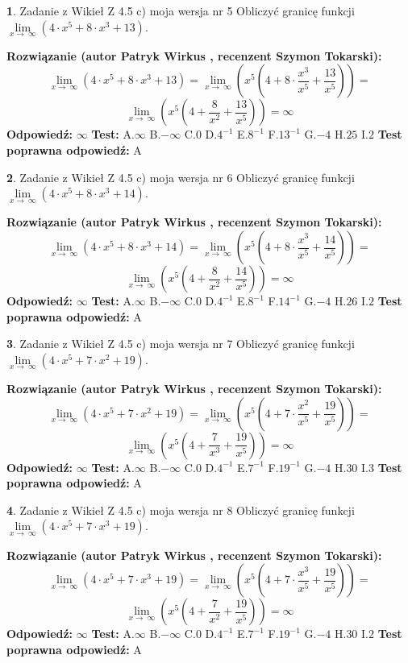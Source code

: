 \documentclass[12pt, a4paper]{article}
\theoremstyle{definition} %
\newtheorem{zad}{}
\newcommand{\zadStart}[1]{\begin{zad}#1\newline}
\newcommand{\zadStop}{\end{zad}}
\newcommand{\rozwStart}[2]{\noindent \textbf{Rozwiązanie (autor #1 , recenzent #2): }\newline}
\newcommand{\rozwStop}{\newline}
\newcommand{\odpStart}{\noindent \textbf{Odpowiedź:}\newline}
\newcommand{\odpStop}{\newline}
\newcommand{\testStart}{\noindent \textbf{Test:}\newline}
\newcommand{\testStop}{\newline}
\newcommand{\kluczStart}{\noindent \textbf{Test poprawna odpowiedź:}\newline}
\newcommand{\kluczStop}{\newline}
\begin{document}
\zadStart{Zadanie z Wikieł Z 4.5 c) moja wersja nr 5}
Obliczyć granicę funkcji  $\lim\limits_{x\to\ \infty}(4 \cdot x^{5}+8 \cdot x^{3}+13)$.
\zadStop
\rozwStart{Patryk Wirkus}{Szymon Tokarski}
$$\lim\limits_{x\to\ \infty}(4 \cdot x^{5}+8 \cdot x^{3}+13) = \lim\limits_{x\to\ \infty}(x^{5}(4 +8 \cdot \frac{x^{3}}{x^{5}}+\frac{13}{x^{5}})) =$$ $$\lim\limits_{x\to\ \infty}(x^{5}(4 +\frac{8}{x^{2}}+\frac{13}{x^{5}})) =\infty$$
\rozwStop
\odpStart
$\infty$
\odpStop
\testStart
A.$\infty$ B.$-\infty$ C.$0$ D.$4^{-1}$ E.$8^{-1}$
F.$13^{-1}$ G.$-4$
H.$25$
I.$2$
\testStop
\kluczStart
A
\kluczStop



\zadStart{Zadanie z Wikieł Z 4.5 c) moja wersja nr 6}
Obliczyć granicę funkcji  $\lim\limits_{x\to\ \infty}(4 \cdot x^{5}+8 \cdot x^{3}+14)$.
\zadStop
\rozwStart{Patryk Wirkus}{Szymon Tokarski}
$$\lim\limits_{x\to\ \infty}(4 \cdot x^{5}+8 \cdot x^{3}+14) = \lim\limits_{x\to\ \infty}(x^{5}(4 +8 \cdot \frac{x^{3}}{x^{5}}+\frac{14}{x^{5}})) =$$ $$\lim\limits_{x\to\ \infty}(x^{5}(4 +\frac{8}{x^{2}}+\frac{14}{x^{5}})) =\infty$$
\rozwStop
\odpStart
$\infty$
\odpStop
\testStart
A.$\infty$ B.$-\infty$ C.$0$ D.$4^{-1}$ E.$8^{-1}$
F.$14^{-1}$ G.$-4$
H.$26$
I.$2$
\testStop
\kluczStart
A
\kluczStop



\zadStart{Zadanie z Wikieł Z 4.5 c) moja wersja nr 7}
Obliczyć granicę funkcji  $\lim\limits_{x\to\ \infty}(4 \cdot x^{5}+7 \cdot x^{2}+19)$.
\zadStop
\rozwStart{Patryk Wirkus}{Szymon Tokarski}
$$\lim\limits_{x\to\ \infty}(4 \cdot x^{5}+7 \cdot x^{2}+19) = \lim\limits_{x\to\ \infty}(x^{5}(4 +7 \cdot \frac{x^{2}}{x^{5}}+\frac{19}{x^{5}})) =$$ $$\lim\limits_{x\to\ \infty}(x^{5}(4 +\frac{7}{x^{3}}+\frac{19}{x^{5}})) =\infty$$
\rozwStop
\odpStart
$\infty$
\odpStop
\testStart
A.$\infty$ B.$-\infty$ C.$0$ D.$4^{-1}$ E.$7^{-1}$
F.$19^{-1}$ G.$-4$
H.$30$
I.$3$
\testStop
\kluczStart
A
\kluczStop



\zadStart{Zadanie z Wikieł Z 4.5 c) moja wersja nr 8}
Obliczyć granicę funkcji  $\lim\limits_{x\to\ \infty}(4 \cdot x^{5}+7 \cdot x^{3}+19)$.
\zadStop
\rozwStart{Patryk Wirkus}{Szymon Tokarski}
$$\lim\limits_{x\to\ \infty}(4 \cdot x^{5}+7 \cdot x^{3}+19) = \lim\limits_{x\to\ \infty}(x^{5}(4 +7 \cdot \frac{x^{3}}{x^{5}}+\frac{19}{x^{5}})) =$$ $$\lim\limits_{x\to\ \infty}(x^{5}(4 +\frac{7}{x^{2}}+\frac{19}{x^{5}})) =\infty$$
\rozwStop
\odpStart
$\infty$
\odpStop
\testStart
A.$\infty$ B.$-\infty$ C.$0$ D.$4^{-1}$ E.$7^{-1}$
F.$19^{-1}$ G.$-4$
H.$30$
I.$2$
\testStop
\kluczStart
A
\kluczStop
\end{document}
